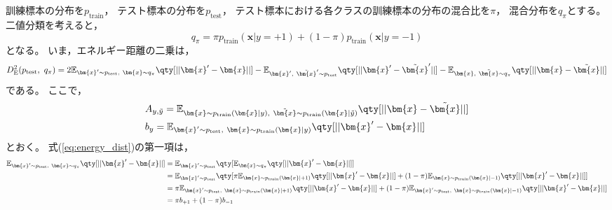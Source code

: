 \documentclass[class=jsarticle, crop=false, dvipdfmx, fleqn]{standalone}
\begin{document}
\section{}

訓練標本の分布を\(p_\mathrm{train}\)，
テスト標本の分布を\(p_\mathrm{test}\)，
テスト標本における各クラスの訓練標本の分布の混合比を\(\pi\)，
混合分布を\(q_\pi\)とする。
二値分類を考えると，
\begin{equation}
    q_\pi = \pi p_\mathrm{train} (\bm{x} | y=+1) + (1-\pi) p_\mathrm{train} (\bm{x} | y=-1)
\end{equation}
となる。
いま，エネルギー距離の二乗は，
\begin{equation}
    D_\mathrm{E}^2 (p_\mathrm{test},\ q_\pi)
        = 2 \mathbb{E}_{\bm{x}' \sim p_\mathrm{test},\ \bm{x} \sim q_\pi} \qty[||\bm{x}' - \bm{x}||]
            - \mathbb{E}_{\bm{x}',\ \tilde{\bm{x}}' \sim p_\mathrm{test}} \qty[||\bm{x}' - \tilde{\bm{x}}'||]
            - \mathbb{E}_{\bm{x},\ \tilde{\bm{x}} \sim q_\pi} \qty[||\bm{x} - \tilde{\bm{x}}||]
    \label{eq:energy_dist}
\end{equation}
である。
ここで，
\begin{align}
    & A_{y, \tilde{y}} = \mathbb{E}_{\bm{x} \sim p_\mathrm{train} (\bm{x} | y),\ \tilde{\bm{x}} \sim p_\mathrm{train} (\bm{x} | \tilde{y})} \qty[||\bm{x} - \tilde{\bm{x}}||]
    \label{eq:A} \\
    & b_y = \mathbb{E}_{\bm{x}' \sim p_\mathrm{test},\ \bm{x} \sim p_\mathrm{train} (\bm{x} | y)} \qty[||\bm{x}' - \bm{x}||]
    \label{eq:b}
\end{align}
とおく。
式(\ref{eq:energy_dist})の第一項は，
\begin{align*}
    \mathbb{E}_{\bm{x}' \sim p_\mathrm{test},\ \bm{x} \sim q_\pi} \qty[||\bm{x}' - \bm{x}||]
        & = \mathbb{E}_{\bm{x}' \sim p_\mathrm{test}} \qty[\mathbb{E}_{\bm{x} \sim q_\pi} \qty[||\bm{x}' - \bm{x}||]] \\
        & = \mathbb{E}_{\bm{x}' \sim p_\mathrm{test}} \qty[
            \pi \mathbb{E}_{\bm{x} \sim p_\mathrm{train} (\bm{x} | +1)} \qty[||\bm{x}' - \bm{x}||]
            + (1 - \pi) \mathbb{E}_{\bm{x} \sim p_\mathrm{train} (\bm{x} | -1)} \qty[||\bm{x}' - \bm{x}||]
            ] \\
        & = \pi \mathbb{E}_{\bm{x}' \sim p_\mathrm{test},\ \bm{x} \sim p_\mathrm{train} (\bm{x} | +1)} \qty[||\bm{x}' - \bm{x}||]
            + (1 - \pi) \mathbb{E}_{\bm{x}' \sim p_\mathrm{test},\ \bm{x} \sim p_\mathrm{train} (\bm{x} | -1)} \qty[||\bm{x}' - \bm{x}||] \\
        & = \pi b_{+1} + (1 - \pi) b_{-1}
\end{align*}
\end{document}
